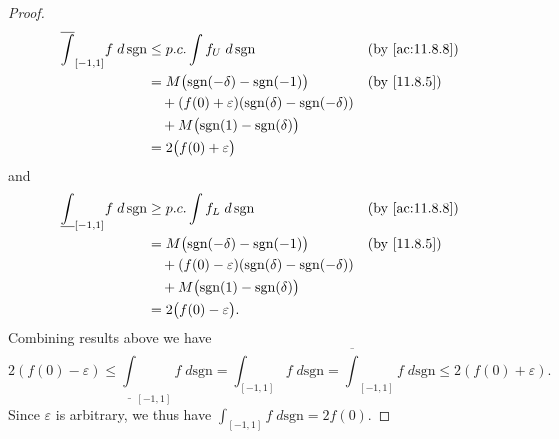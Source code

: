 \begin{proof}
\begin{align*}
    \overline{\int}_{[-1, 1]} f \; d \, \text{sgn} & \leq p.c. \int f_U \; d \, \text{sgn}                                   &  & \text{(by \cref{ac:11.8.8})} \\
                                                   & = M \big(\text{sgn}(-\delta) - \text{sgn}(-1)\big)                      &  & \text{(by \cref{11.8.5})}    \\
                                                   & \quad + (f(0) + \varepsilon) (\text{sgn}(\delta) - \text{sgn}(-\delta))                                   \\
                                                   & \quad + M \big(\text{sgn}(1) - \text{sgn}(\delta)\big)                                                    \\
                                                   & = 2\big(f(0) + \varepsilon\big)
  \end{align*}
  and
  \begin{align*}
    \underline{\int}_{[-1, 1]} f \; d \, \text{sgn} & \geq p.c. \int f_L \; d \, \text{sgn}                                   &  & \text{(by \cref{ac:11.8.8})} \\
                                                    & = M \big(\text{sgn}(-\delta) - \text{sgn}(-1)\big)                      &  & \text{(by \cref{11.8.5})}    \\
                                                    & \quad + (f(0) - \varepsilon) (\text{sgn}(\delta) - \text{sgn}(-\delta))                                   \\
                                                    & \quad + M \big(\text{sgn}(1) - \text{sgn}(\delta)\big)                                                    \\
                                                    & = 2\big(f(0) - \varepsilon\big).
  \end{align*}
  Combining results above we have
  \[
    2(f(0) - \varepsilon) \leq \underline{\int}_{[-1, 1]} f \; d \text{sgn} = \int_{[-1, 1]} f \; d \text{sgn} = \overline{\int}_{[-1, 1]} f \; d \text{sgn} \leq 2(f(0) + \varepsilon).
  \]
  Since \(\varepsilon\) is arbitrary, we thus have \(\int_{[-1, 1]} f \; d \text{sgn} = 2f(0)\).
\end{proof}